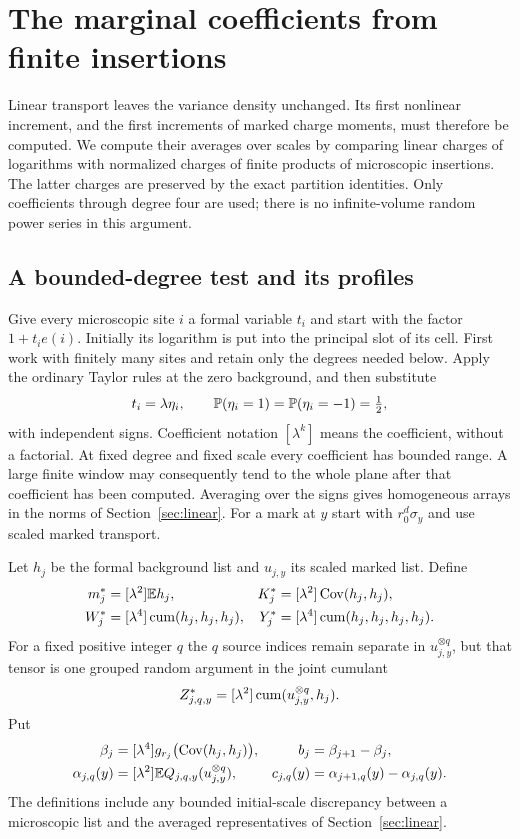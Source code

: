 \section{The marginal coefficients from finite insertions}\label{sec:coefficients}
Linear transport leaves the variance density unchanged.  Its first nonlinear
increment, and the first increments of marked charge moments, must therefore
be computed.  We compute their averages over scales by comparing linear
charges of logarithms with normalized charges of finite products of
microscopic insertions.  The latter charges are preserved by the exact
partition identities.  Only coefficients through degree four are used;
there is no infinite-volume random power series in this argument.

\subsection{A bounded-degree test and its profiles}
Give every microscopic site $i$ a formal variable $t_i$ and start with the
factor $1+t_i e(i)$.  Initially its logarithm is put into the principal slot
of its cell.  First work with finitely many sites and retain only the degrees
needed below.  Apply the ordinary Taylor rules at the zero background, and
then substitute
\begin{equation}\label{coef:test}
 t_i=\lambda\eta_i,\qquad
 \mathbb P(\eta_i=1)=\mathbb P(\eta_i=-1)=\tfrac12,
\end{equation}
with independent signs.  Coefficient notation $[\lambda^k]$ means the
coefficient, without a factorial.  At fixed degree and fixed scale every
coefficient has bounded range.  A large finite window may consequently tend
to the whole plane after that coefficient has been computed.  Averaging over
the signs gives homogeneous arrays in the norms of Section~\ref{sec:linear}.
For a mark at $y$ start with $r_0^d\sigma_y$ and use scaled marked transport.

Let $h_j$ be the formal background list and $u_{j,y}$ its scaled marked
list.  Define
\begin{align*}
 m_j^*&=[\lambda^2]\mathbb E h_j,&
 K_j^*&=[\lambda^2]\operatorname{Cov}(h_j,h_j),\\
 W_j^*&=[\lambda^4]\operatorname{cum}(h_j,h_j,h_j),&
 Y_j^*&=[\lambda^4]\operatorname{cum}(h_j,h_j,h_j,h_j).
\end{align*}
For a fixed positive integer $q$ the $q$ source indices remain separate in
$u_{j,y}^{\otimes q}$, but that tensor is one grouped random argument in the
joint cumulant
\begin{equation}\label{coef:Z}
 Z_{j,q,y}^*=[\lambda^2]\operatorname{cum}(u_{j,y}^{\otimes q},h_j).
\end{equation}
Put
\begin{align}
 \beta_j&=[\lambda^4]g_{r_j}\bigl(\operatorname{Cov}(h_j,h_j)\bigr),
       &b_j&=\beta_{j+1}-\beta_j,\label{coef:b}\\
 \alpha_{j,q}(y)&=[\lambda^2]\mathbb E
                   Q_{j,q,y}(u_{j,y}^{\otimes q}),
       &c_{j,q}(y)&=\alpha_{j+1,q}(y)-\alpha_{j,q}(y).
       \label{coef:c}
\end{align}
The definitions include any bounded initial-scale discrepancy between a
microscopic list and the averaged representatives of Section~\ref{sec:linear}.

